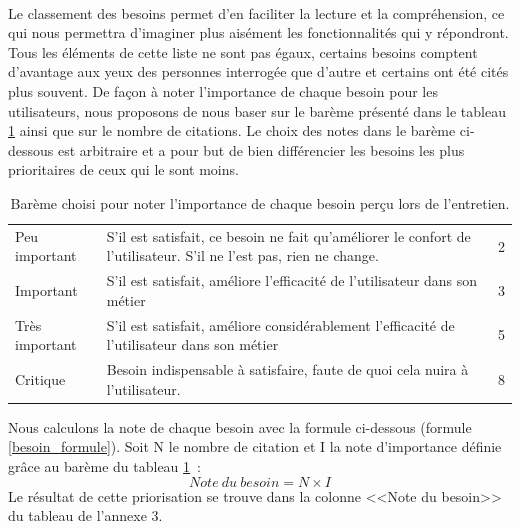 			\paragraph{}%
			Le classement des besoins permet d'en faciliter la lecture et la
			compréhension, ce qui nous permettra d'imaginer plus aisément les
			fonctionnalités qui y répondront. Tous les éléments de cette
			liste ne sont pas égaux, certains besoins comptent d'avantage aux yeux des
			personnes interrogée que d'autre et certains ont été cités plus
			souvent.\newline
			De façon à noter l'importance de chaque besoin pour les utilisateurs, nous
			proposons de nous baser sur le barème présenté dans le tableau
			\ref{bareme_besoins} ainsi que sur le nombre de citations. Le choix des notes
			dans le barème ci-dessous est arbitraire et a pour but
			de bien différencier les besoins les plus prioritaires de ceux qui le sont moins.
			\begin{table}[H]
				\centering
				\caption{\label{bareme_besoins} Barème choisi pour noter l'importance de
				chaque besoin perçu lors de l'entretien.}
				\begin{tabular}{| p{4cm} | p{8cm} | p{2cm} |}
					\hline
						\thead{Priorité}
						&\thead{Description}
						&\thead{Note}
						\\
					\hline
						Peu important
						&
						S'il est satisfait, ce besoin ne fait qu'améliorer le confort de l'utilisateur. S'il ne l'est pas, rien ne change.
						&
						2
						\\
					\hline
						Important
						&
						S'il est satisfait, améliore l'efficacité de l'utilisateur dans son métier
						&
						3
						\\
					\hline
						Très important
						&
						S'il est satisfait, améliore considérablement l'efficacité de l'utilisateur dans son métier
						&
						5
						\\
					\hline
						Critique
						&
						Besoin indispensable à satisfaire, faute de quoi cela nuira à l'utilisateur.
						&
						8
						\\
					\hline
				\end{tabular}
			\end{table}
			Nous calculons la note de chaque besoin avec la formule ci-dessous
			(formule \ref{besoin_formule}).
			Soit N le nombre de citation et I la note d'importance définie grâce au
			barème du tableau \ref{bareme_besoins}~:
			\begin{equation}
				\label{besoin_formule}
				Note\ du\ besoin=N\times I
			\end{equation}
			Le résultat de cette priorisation se trouve dans la colonne <<Note du besoin>>
			du tableau de l'annexe 3.
	
